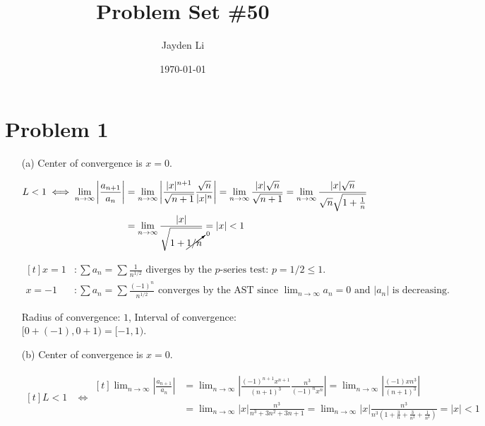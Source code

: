 \documentclass[preview, margin=0.6in]{standalone}
\title{\vspace*{-40pt}Problem Set \#50}
\author{Jayden Li}
\date{\today}
\newcommand*{\problem}[1]{\section*{Problem #1}}
\begin{document}
\fontsize{12pt}{12pt}\selectfont
\setlength{\abovedisplayskip}{\abovedisplayskip/2}
\setlength{\belowdisplayskip}{\belowdisplayskip/2}
\setlength{\parindent}{0pt}
\setlength{\parskip}{2ex plus 0.5ex minus 0.2ex}
\maketitle

\problem{1}
\begin{itemize}
\item[(a)]
	Center of convergence is $x=0$.

	$\begin{aligned}[t]
		L<1
		&\iff 
		\begin{aligned}[t]
			\lim_{n\to\infty}\left|\frac{a_{n+1}}{a_n}\right|
			&=\lim_{n\to\infty}\left|\frac{|x|^{n+1}}{\sqrt{n+1}}\frac{\sqrt{n}}{|x|^n}\right|
			=\lim_{n\to\infty}\frac{|x| \sqrt n}{\sqrt{n+1}}
			=\lim_{n\to\infty}\frac{|x| \sqrt{n}}{\sqrt{n}\sqrt{1+\frac1n}} \\
			&=\lim_{n\to\infty}\frac{|x|}{\sqrt{1+\cancelto{0}{1/n}}}
			=|x|<1
		\end{aligned}
	\end{aligned}$

	$\begin{aligned}[t]
		x=1 &: \sum a_n=\sum \frac{1}{n^{1/2}}\text{ diverges by the $p$-series test: $p=1/2\leq1$.} \\
		x=-1&: \sum a_n=\sum \frac{(-1)^n}{n^{1/2}}\text{ converges by the AST since $\lim_{n\to\infty}a_n=0$ and $|a_n|$ is decreasing.}
	\end{aligned}$

	Radius of convergence: $1$, Interval of convergence: $[0+(-1), 0+1)=\boxed{[-1,1)}$.

\item[(b)]
	Center of convergence is $x=0$.

	$\begin{aligned}[t]
		L<1
		&\iff 
		\begin{aligned}[t]
			\lim_{n\to\infty}\left|\frac{a_{n+1}}{a_n}\right|
			&=\lim_{n\to\infty}\left|\frac{(-1)^{n+1}x^{n+1}}{(n+1)^3} \frac{n^3}{(-1)^n x^n}\right|
			=\lim_{n\to\infty}\left|\frac{(-1)xn^3}{(n+1)^3}\right| \\
			&=\lim_{n\to\infty}|x|\frac{n^3}{n^3+3n^2+3n+1}
			=\lim_{n\to\infty}|x|\frac{n^3}{n^3 \left(1+\frac{3}{n}+\frac{3}{n^2}+\frac{1}{n^3}\right)}
			=|x|<1
		\end{aligned}
	\end{aligned}$


\end{itemize}
\end{document}

